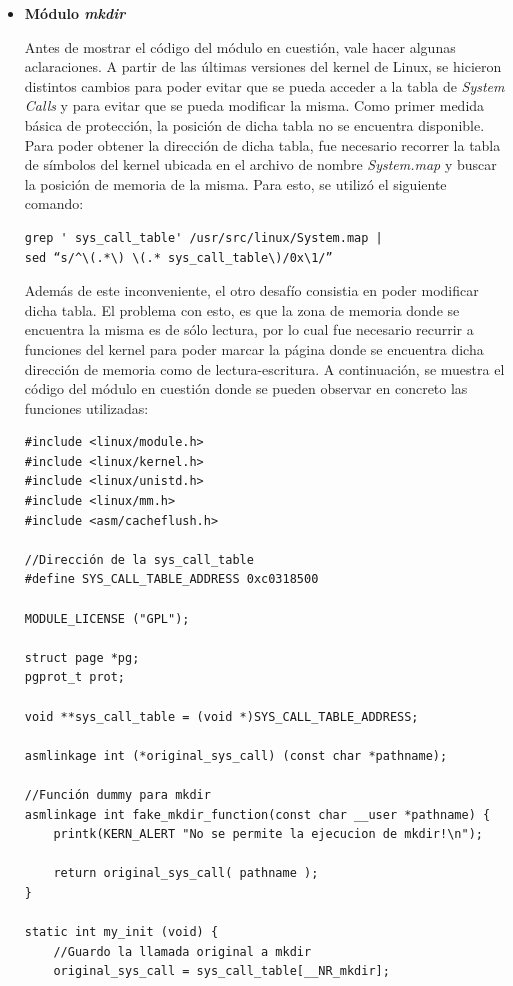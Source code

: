\documentclass[a4paper,11pt] {article}
\begin{document}
\begin{itemize}
	\item \textbf{Módulo \textit{mkdir}}

	Antes de mostrar el código del módulo en cuestión, vale hacer algunas aclaraciones. A partir de las últimas versiones del kernel de Linux, se hicieron distintos cambios para poder evitar que se pueda acceder a la tabla de \textit{System Calls} y para evitar que se pueda modificar la misma. Como primer medida básica de protección, la posición de dicha tabla no se encuentra disponible. Para poder obtener la dirección de dicha tabla, fue necesario recorrer la tabla de símbolos del kernel ubicada en el archivo de nombre \textit{System.map} y buscar la posición de memoria de la misma. Para esto, se utilizó el siguiente comando:

\begin{verbatim}
grep ' sys_call_table' /usr/src/linux/System.map |
sed “s/^\(.*\) \(.* sys_call_table\)/0x\1/”
\end{verbatim}

	Además de este inconveniente, el otro desafío consistia en poder modificar dicha tabla. El problema con esto, es que la zona de memoria donde se encuentra la misma es de sólo lectura, por lo cual fue necesario recurrir a funciones del kernel para poder marcar la página donde se encuentra dicha dirección de memoria como de lectura-escritura. A continuación, se muestra el código del módulo en cuestión donde se pueden observar en concreto las funciones utilizadas:

\begin{verbatim}
#include <linux/module.h>
#include <linux/kernel.h>
#include <linux/unistd.h>
#include <linux/mm.h>
#include <asm/cacheflush.h>

//Dirección de la sys_call_table
#define SYS_CALL_TABLE_ADDRESS 0xc0318500

MODULE_LICENSE ("GPL");

struct page *pg;
pgprot_t prot;

void **sys_call_table = (void *)SYS_CALL_TABLE_ADDRESS;

asmlinkage int (*original_sys_call) (const char *pathname);

//Función dummy para mkdir
asmlinkage int fake_mkdir_function(const char __user *pathname) {
    printk(KERN_ALERT "No se permite la ejecucion de mkdir!\n");

    return original_sys_call( pathname );
}

static int my_init (void) {
    //Guardo la llamada original a mkdir
    original_sys_call = sys_call_table[__NR_mkdir];


\end{verbatim}
\end{itemize}
\end{document}
